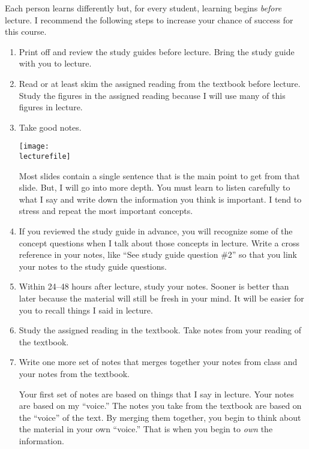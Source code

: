 \documentclass[letterpaper]{tufte-handout}
\newcommand\lecturefile{163_lecture00}
\begin{document}
Each person learns differently but, for every student, learning begins \emph{before} lecture.  I recommend the following steps to increase your chance of success for this course. 


\begin{enumerate}

	\item Print off and review the study guides before lecture. Bring the study guide with you to lecture.
	
	\item Read or at least skim the assigned reading from the textbook before lecture. Study the figures in the assigned reading because I will use many of this figures in lecture.
	
	\item Take good notes.\begin{marginfigure}\texttt{[image: \\lecturefile]}\end{marginfigure} Most slides contain a single sentence that is the main point to get from that slide. But, I will go into more depth. You must learn to listen carefully to what I say and write down the information you think is important. I tend to stress and repeat the most important concepts. 
	
	\item If you reviewed the study guide in advance, you will recognize some of the concept questions when I talk about those concepts in lecture. Write a cross reference in your notes, like “See study guide question \#2” so that you link your notes to the study guide questions.
	
	\item Within 24–48 hours after lecture, study your notes.  Sooner is better than later because the material will still be fresh in your mind. It will be easier for you to recall things I said in lecture.
	
	\item Study the assigned reading in the textbook. Take notes from your reading of the textbook.
	
	\item Write one more set of notes that merges together your notes from class and your notes from the textbook.  
	
	Your first set of notes are based on things that I say in lecture. Your notes are based on my “voice.” The notes you take from the textbook are based on the “voice” of the text. By merging them together, you begin to think about the material in your own “voice.” That is when you begin to \emph{own} the information.
	

\end{enumerate}
\end{document}

